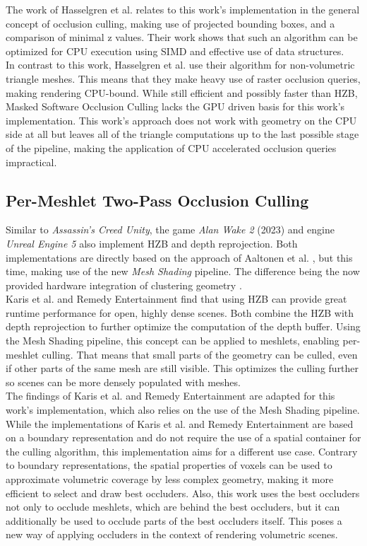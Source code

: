\noindent
The work of Hasselgren et al. relates to this work's implementation in the general concept of occlusion culling, making 
use of projected bounding boxes, and a comparison of minimal z values. Their work shows that such an algorithm can be 
optimized for \ac{CPU} execution using \ac{SIMD} and effective use of data structures. \\

\noindent 
In contrast to this work, Hasselgren et al. use their algorithm for non-volumetric triangle meshes. This means that 
they make heavy use of raster occlusion queries, making rendering CPU-bound. While still efficient and possibly faster 
than \ac{HZB}, Masked Software Occlusion Culling lacks the \ac{GPU} driven basis for this work's implementation. This 
work's approach does not work with geometry on the \ac{CPU} side at all but leaves all of the triangle computations up 
to the last possible stage of the pipeline, making the application of \ac{CPU} accelerated occlusion queries impractical.


\subsection*{Per-Meshlet Two-Pass Occlusion Culling}

Similar to \emph{Assassin's Creed Unity}, the game \emph{Alan Wake 2} (2023) and engine \emph{Unreal Engine 5} also 
implement \ac{HZB} and depth reprojection. Both implementations are directly based on the approach of Aaltonen et 
al. \cite{Aaltonen2015}, but this time, making use of the new \emph{Mesh Shading} pipeline. The difference being the 
now provided hardware integration of clustering geometry \cite{Remedy2023,Karis2021}. \\

\noindent
Karis et al. and Remedy Entertainment find that using \ac{HZB} can provide great runtime performance for open, 
highly dense scenes. Both combine the \ac{HZB} with depth reprojection to further optimize the computation of the 
depth buffer. Using the Mesh Shading pipeline, this concept can be applied to meshlets, enabling per-meshlet culling. 
That means that small parts of the geometry can be culled, even if other parts of the same mesh are still visible. 
This optimizes the culling further so scenes can be more densely populated with meshes. \\

\noindent
The findings of Karis et al. and Remedy Entertainment are adapted for this work's implementation, which also relies on 
the use of the Mesh Shading pipeline. While the implementations of Karis et al. and Remedy Entertainment are based on 
a boundary representation and do not require the use of a spatial container for the culling algorithm, this 
implementation aims for a different use case. Contrary to boundary representations, the spatial properties of voxels 
can be used to approximate volumetric coverage by less complex geometry, making it more efficient to select and draw 
best occluders. Also, this work uses the best occluders not only to occlude meshlets, which are behind the best occluders, 
but it can additionally be used to occlude parts of the best occluders itself. This poses a new way of applying occluders 
in the context of rendering volumetric scenes.
